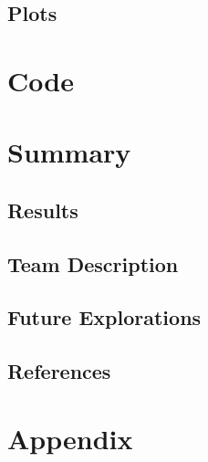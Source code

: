 \documentclass[11pt]{article}
\begin{document}
\subsection{Plots}





\section{Code}



\section{Summary}
\subsection{Results}


\subsection{Team Description}


\subsection{Future Explorations}


\subsection{References}

\section*{Appendix}
\end{document}

